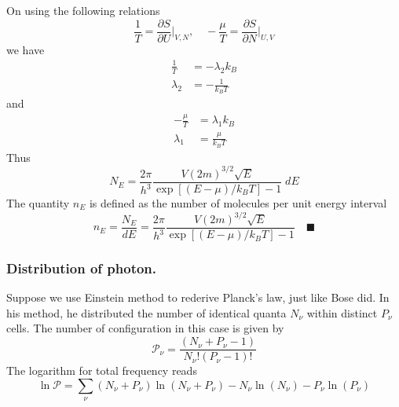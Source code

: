 \documentclass[../../../Main.tex]{subfiles}
\begin{document}
On using the following relations
\begin{equation*}
    \frac{1}{T}=\frac{\partial S}{\partial U}\bigg|_{V,N},\quad -\frac{\mu}{T}=\frac{\partial S}{\partial N}\bigg|_{U,V}
\end{equation*}
we have 
\begin{align*}
    \frac{1}{T}&=-\lambda_2k_B\\
    \lambda_2&=-\frac{1}{k_BT}
\end{align*}
and
\begin{align*}
    -\frac{\mu}{T}&=\lambda_1k_B\\
    \lambda_1&=\frac{\mu}{k_BT}
\end{align*}
Thus
\begin{equation*}
    N_E=\frac{2\pi}{h^3} \frac{V (2m)^{3/2}\sqrt{E}}{\exp\left[(E-\mu)/k_BT\right]-1} \;dE
\end{equation*}
The quantity $n_E$ is defined as the number of molecules per unit energy interval
\begin{equation*}
    n_E=\frac{N_E}{dE}=\frac{2\pi}{h^3} \frac{V (2m)^{3/2}\sqrt{E}}{\exp\left[(E-\mu)/k_BT\right]-1} \quad\blacksquare
\end{equation*}

\subsubsection*{Distribution of photon.} Suppose we use Einstein method to rederive Planck's law, just like Bose did. In his method, he distributed the number of identical quanta $N_\nu$ within distinct $P_\nu$ cells. The number of configuration in this case is given by 
\begin{equation*}
    \mathcal{P}_\nu=\frac{(N_\nu+P_\nu-1)}{N_\nu! (P_\nu-1)!}
\end{equation*}
The logarithm for total frequency reads
\begin{equation*}
    \ln \mathcal{P}=\sum_\nu (N_\nu+P_\nu)\ln (N_\nu+P_\nu)-N_\nu\ln(N_\nu)- P_\nu \ln (P_\nu)
\end{equation*}
\end{document}
